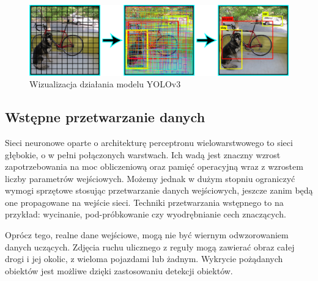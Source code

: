 \begin{figure}[h!]
    \begin{center}
        \includegraphics[scale=0.338]{img/yolo_vis.png}
    \end{center}
    \caption{Wizualizacja działania modelu YOLOv3 \cite{yolo_vis}}
    \label{fig:yolo_vis}
\end{figure}
 
 \pagebreak
 
\subsection{Wstępne przetwarzanie danych}
Sieci neuronowe oparte o architekturę perceptronu wielowarstwowego to sieci głębokie, o w pełni połączonych warstwach. Ich wadą jest znaczny wzrost zapotrzebowania na moc obliczeniową oraz pamięć operacyjną wraz z wzrostem liczby parametrów wejściowych. Możemy jednak w dużym stopniu ograniczyć wymogi sprzętowe stosując przetwarzanie danych wejściowych, jeszcze zanim będą one propagowane na wejście sieci. Techniki przetwarzania wstępnego to na przykład: wycinanie, pod-próbkowanie czy wyodrębnianie cech znaczących.

Oprócz tego, realne dane wejściowe, mogą nie być wiernym odwzorowaniem danych uczących. Zdjęcia ruchu ulicznego z reguły mogą zawierać obraz całej drogi i jej okolic, z wieloma pojazdami lub żadnym. Wykrycie pożądanych obiektów jest możliwe dzięki zastosowaniu detekcji obiektów.

